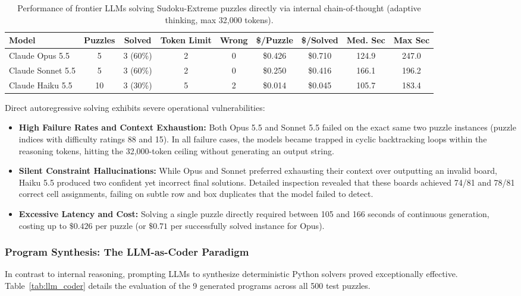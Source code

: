 \documentclass{article} %
\begin{document}
\begin{table}[ht]
\centering
\small
\caption{Performance of frontier LLMs solving Sudoku-Extreme puzzles directly via internal chain-of-thought (adaptive thinking, max 32,000 tokens).}
\label{tab:llm_direct}
\begin{tabular}{lcccccccc}
\toprule
\textbf{Model} & \textbf{Puzzles} & \textbf{Solved} & \textbf{Token Limit} & \textbf{Wrong} & \textbf{\$/Puzzle} & \textbf{\$/Solved} & \textbf{Med. Sec} & \textbf{Max Sec} \\
\midrule
Claude Opus 5.5   & 5  & 3 (60\%) & 2 & 0 & \$0.426 & \$0.710 & 124.9 & 247.0 \\
Claude Sonnet 5.5 & 5  & 3 (60\%) & 2 & 0 & \$0.250 & \$0.416 & 166.1 & 196.2 \\
Claude Haiku 5.5  & 10 & 3 (30\%) & 5 & 2 & \$0.014 & \$0.045 & 105.7 & 183.4 \\
\bottomrule
\end{tabular}
\end{table}

Direct autoregressive solving exhibits severe operational vulnerabilities:
\begin{itemize}
    \item \textbf{High Failure Rates and Context Exhaustion:} Both Opus 5.5 and Sonnet 5.5 failed on the exact same two puzzle instances (puzzle indices with difficulty ratings 88 and 15). In all failure cases, the models became trapped in cyclic backtracking loops within the reasoning tokens, hitting the 32,000-token ceiling without generating an output string.
    \item \textbf{Silent Constraint Hallucinations:} While Opus and Sonnet preferred exhausting their context over outputting an invalid board, Haiku 5.5 produced two confident yet incorrect final solutions. Detailed inspection revealed that these boards achieved 74/81 and 78/81 correct cell assignments, failing on subtle row and box duplicates that the model failed to detect.
    \item \textbf{Excessive Latency and Cost:} Solving a single puzzle directly required between 105 and 166 seconds of continuous generation, costing up to $\$0.426$ per puzzle (or $\$0.71$ per successfully solved instance for Opus).
\end{itemize}

\subsubsection{Program Synthesis: The LLM-as-Coder Paradigm}
In contrast to internal reasoning, prompting LLMs to synthesize deterministic Python solvers proved exceptionally effective. Table~\ref{tab:llm_coder} details the evaluation of the 9 generated programs across all 500 test puzzles.
\end{document}
